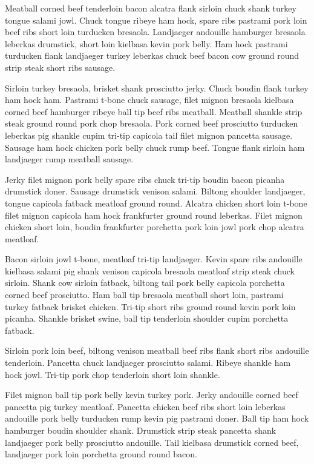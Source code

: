 \documentclass[openany,letterpaper,11pt]{report}
\begin{document}
Meatball corned beef tenderloin bacon alcatra flank sirloin chuck shank turkey tongue salami jowl. Chuck tongue ribeye ham hock, spare ribs pastrami pork loin beef ribs short loin turducken bresaola. Landjaeger andouille hamburger bresaola leberkas drumstick, short loin kielbasa kevin pork belly. Ham hock pastrami turducken flank landjaeger turkey leberkas chuck beef bacon cow ground round strip steak short ribs sausage.\newline

Sirloin turkey bresaola, brisket shank prosciutto jerky. Chuck boudin flank turkey ham hock ham. Pastrami t-bone chuck sausage, filet mignon bresaola kielbasa corned beef hamburger ribeye ball tip beef ribs meatball. Meatball shankle strip steak ground round pork chop bresaola. Pork corned beef prosciutto turducken leberkas pig shankle cupim tri-tip capicola tail filet mignon pancetta sausage. Sausage ham hock chicken pork belly chuck rump beef. Tongue flank sirloin ham landjaeger rump meatball sausage.\newline

Jerky filet mignon pork belly spare ribs chuck tri-tip boudin bacon picanha drumstick doner. Sausage drumstick venison salami. Biltong shoulder landjaeger, tongue capicola fatback meatloaf ground round. Alcatra chicken short loin t-bone filet mignon capicola ham hock frankfurter ground round leberkas. Filet mignon chicken short loin, boudin frankfurter porchetta pork loin jowl pork chop alcatra meatloaf.\newline

Bacon sirloin jowl t-bone, meatloaf tri-tip landjaeger. Kevin spare ribs andouille kielbasa salami pig shank venison capicola bresaola meatloaf strip steak chuck sirloin. Shank cow sirloin fatback, biltong tail pork belly capicola porchetta corned beef prosciutto. Ham ball tip bresaola meatball short loin, pastrami turkey fatback brisket chicken. Tri-tip short ribs ground round kevin pork loin picanha. Shankle brisket swine, ball tip tenderloin shoulder cupim porchetta fatback.\newline

Sirloin pork loin beef, biltong venison meatball beef ribs flank short ribs andouille tenderloin. Pancetta chuck landjaeger prosciutto salami. Ribeye shankle ham hock jowl. Tri-tip pork chop tenderloin short loin shankle.\newline

Filet mignon ball tip pork belly kevin turkey pork. Jerky andouille corned beef pancetta pig turkey meatloaf. Pancetta chicken beef ribs short loin leberkas andouille pork belly turducken rump kevin pig pastrami doner. Ball tip ham hock hamburger boudin shoulder shank. Drumstick strip steak pancetta shank landjaeger pork belly prosciutto andouille. Tail kielbasa drumstick corned beef, landjaeger pork loin porchetta ground round bacon.\newline
\end{document}
